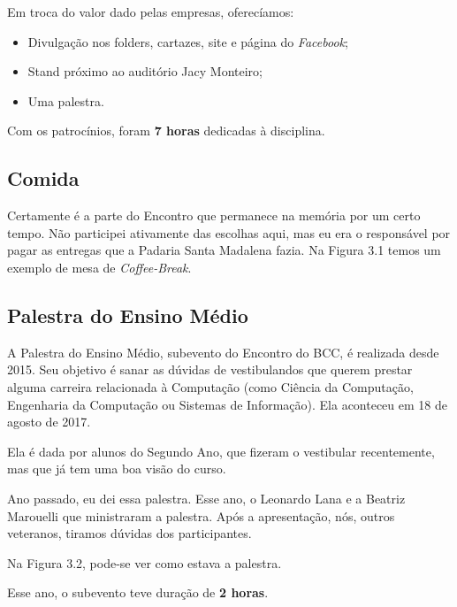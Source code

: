 \documentclass[12pt,letterpaper]{article}
\begin{document}
	Em troca do valor dado pelas empresas, oferecíamos:
	
	\begin{itemize}
		\item Divulgação nos folders, cartazes, site e página do \textit{Facebook};
		\item Stand próximo ao auditório Jacy Monteiro;
		\item Uma palestra.
	\end{itemize}
	
	Com os patrocínios, foram \textbf{7 horas} dedicadas à disciplina.
	
	\subsection{Comida}
	
	Certamente é a parte do Encontro que permanece na memória por um certo tempo. Não participei ativamente das escolhas aqui, mas eu era o responsável por pagar as entregas que a Padaria Santa Madalena fazia. Na Figura 3.1 temos um exemplo de mesa de \textit{Coffee-Break}.
	
	\subsection{Palestra do Ensino Médio}
	
	A Palestra do Ensino Médio, subevento do Encontro do BCC, é realizada desde 2015. Seu objetivo é sanar as dúvidas de vestibulandos que querem prestar alguma carreira relacionada à Computação (como Ciência da Computação, Engenharia da Computação ou Sistemas de Informação). Ela aconteceu em 18 de agosto de 2017.
	
	Ela é dada por alunos do Segundo Ano, que fizeram o vestibular recentemente, mas que já tem uma boa visão do curso. 
	
	Ano passado, eu dei essa palestra. Esse ano, o Leonardo Lana e a Beatriz Marouelli que ministraram a palestra. Após a apresentação, nós, outros veteranos, tiramos dúvidas dos participantes.
	
	Na Figura 3.2, pode-se ver como estava a palestra.
	
	Esse ano, o subevento teve duração de \textbf{2 horas}.
	
\end{document}
